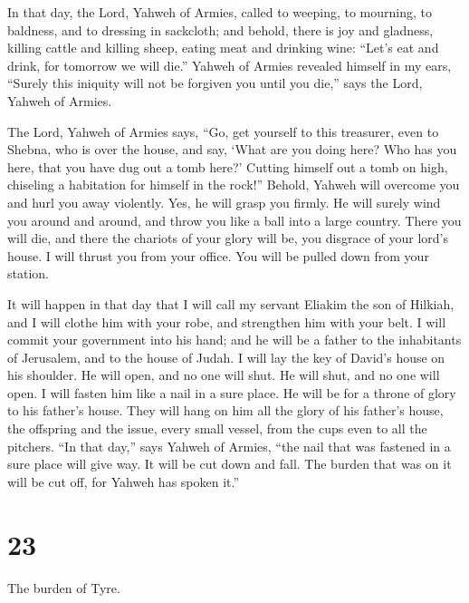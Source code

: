 In that day, the Lord, Yahweh of Armies, called to
weeping, to mourning, to baldness, and to dressing in sackcloth;
 and behold, there is joy and gladness, killing cattle and
killing sheep, eating meat and drinking wine: ``Let's eat and drink, for
tomorrow we will die.''  Yahweh of Armies revealed himself
in my ears, ``Surely this iniquity will not be forgiven you until you
die,'' says the Lord, Yahweh of Armies.

 The Lord, Yahweh of Armies says, ``Go, get yourself to
this treasurer, even to Shebna, who is over the house, and say,
 `What are you doing here? Who has you here, that you have
dug out a tomb here?' Cutting himself out a tomb on high, chiseling a
habitation for himself in the rock!''  Behold, Yahweh will
overcome you and hurl you away violently. Yes, he will grasp you firmly.
 He will surely wind you around and around, and throw you
like a ball into a large country. There you will die, and there the
chariots of your glory will be, you disgrace of your lord's house.
 I will thrust you from your office. You will be pulled
down from your station.

 It will happen in that day that I will call my servant
Eliakim the son of Hilkiah,  and I will clothe him with
your robe, and strengthen him with your belt. I will commit your
government into his hand; and he will be a father to the inhabitants of
Jerusalem, and to the house of Judah.  I will lay the key
of David's house on his shoulder. He will open, and no one will shut. He
will shut, and no one will open.  I will fasten him like a
nail in a sure place. He will be for a throne of glory to his father's
house.  They will hang on him all the glory of his father's
house, the offspring and the issue, every small vessel, from the cups
even to all the pitchers.  ``In that day,'' says Yahweh of
Armies, ``the nail that was fastened in a sure place will give way. It
will be cut down and fall. The burden that was on it will be cut off,
for Yahweh has spoken it.''

\hypertarget{section-22}{%
\section{23}\label{section-22}}

 The burden of Tyre.

